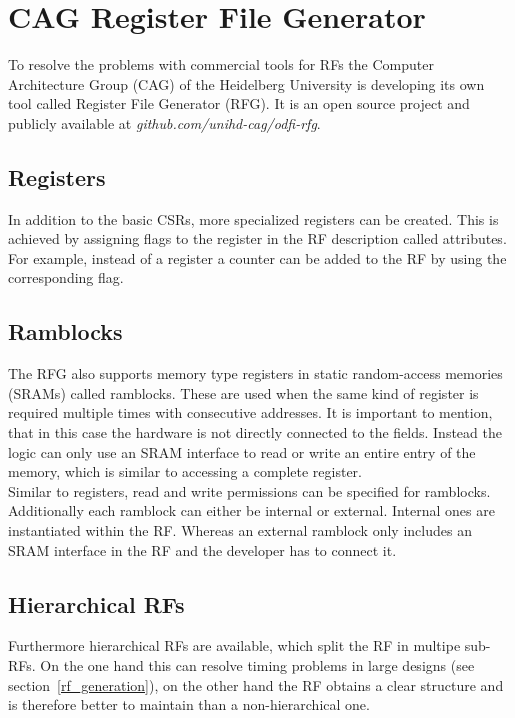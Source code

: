 \section{CAG Register File Generator}
To resolve the problems with commercial tools for RFs the Computer Architecture Group (CAG) of the Heidelberg University is developing its own tool called Register File Generator (RFG). It is an open source project and publicly available at \emph{github.com/unihd-cag/odfi-rfg}.
\subsection{Registers}
In addition to the basic CSRs, more specialized registers can be created. This is achieved by assigning flags to the register in the RF description called attributes. For example, instead of a register a counter can be added to the RF by using the corresponding flag.
\subsection{Ramblocks}
The RFG also supports memory type registers in static random-access memories (SRAMs) called ramblocks. These are used when the same kind of register is required multiple times with consecutive addresses. It is important to mention, that in this case the hardware is not directly connected to the fields. Instead the logic can only use an SRAM interface to read or write an entire entry of the memory, which is similar to accessing a complete register.\\
Similar to registers, read and write permissions can be specified for ramblocks. Additionally each ramblock can either be internal or external. Internal ones are instantiated within the RF. Whereas an external ramblock only includes an SRAM interface in the RF and the developer has to connect it.
\subsection{Hierarchical RFs}
Furthermore hierarchical RFs are available, which split the RF in multipe sub-RFs. On the one hand this can resolve timing problems in large designs (see section~\ref{rf_generation}), on the other hand the RF obtains a clear structure and is therefore better to maintain than a non-hierarchical one.
